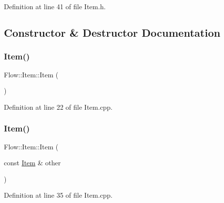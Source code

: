 Definition at line 41 of file Item.\+h.



\subsection{Constructor \& Destructor Documentation}
\hypertarget{class_flow_1_1_item_a5ceb9782e3bcecad6e897205555a2fd2}{}\label{class_flow_1_1_item_a5ceb9782e3bcecad6e897205555a2fd2} 
\subsubsection{\texorpdfstring{Item()}{Item()}\hspace{0.1cm}{\footnotesize\ttfamily [1/3]}}
{\footnotesize\ttfamily Flow\+::\+Item\+::\+Item (\begin{DoxyParamCaption}{ }\end{DoxyParamCaption})}



Definition at line 22 of file Item.\+cpp.

\hypertarget{class_flow_1_1_item_afd155cd633c9271deccc3a64a92ef8a6}{}\label{class_flow_1_1_item_afd155cd633c9271deccc3a64a92ef8a6} 
\subsubsection{\texorpdfstring{Item()}{Item()}\hspace{0.1cm}{\footnotesize\ttfamily [2/3]}}
{\footnotesize\ttfamily Flow\+::\+Item\+::\+Item (\begin{DoxyParamCaption}\item[{const \hyperlink{class_flow_1_1_item}{Item} \&}]{other }\end{DoxyParamCaption})}



Definition at line 35 of file Item.\+cpp.

\hypertarget{class_flow_1_1_item_a4cea6c227d10f7ac43ee098a4aea642a}{}\label{class_flow_1_1_item_a4cea6c227d10f7ac43ee098a4aea642a} 
